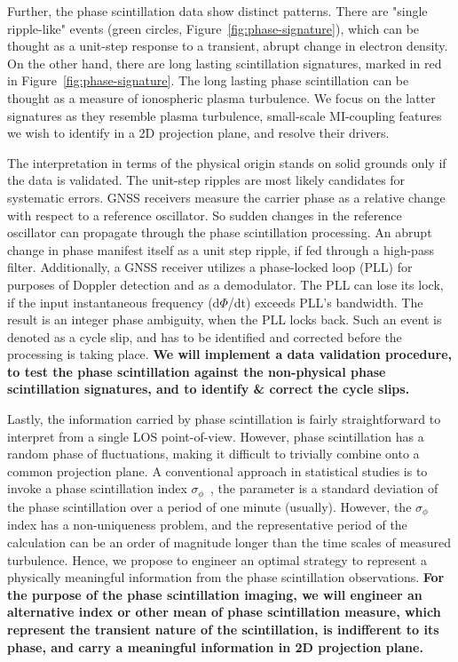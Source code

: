 \documentclass[letterpaper,12pt]{article}
\begin{document}
Further, the phase scintillation data show distinct patterns. There are "single ripple-like" events (green circles, Figure~\ref{fig:phase-signature}), which can be thought as a unit-step response to a transient, abrupt change in electron density. On the other hand, there are long lasting scintillation signatures, marked in red in Figure~\ref{fig:phase-signature}. The long lasting phase scintillation can be thought as a measure of ionospheric plasma turbulence. We focus on the latter signatures as they resemble plasma turbulence, small-scale MI-coupling features we wish to identify in a 2D projection plane, and resolve their drivers.

The interpretation in terms of the physical origin stands on solid grounds only if the data is validated. The unit-step ripples are most likely candidates for systematic errors. GNSS receivers measure the carrier phase as a relative change with respect to a reference oscillator. So sudden changes in the reference oscillator can propagate through the phase scintillation processing. An abrupt change in phase manifest itself as a unit step ripple, if fed through a high-pass filter. Additionally, a GNSS receiver utilizes a phase-locked loop (PLL) for purposes of Doppler detection and as a demodulator. The PLL can lose its lock, if the input instantaneous frequency (d$\Phi$/dt) exceeds PLL's bandwidth. The result is an integer phase ambiguity, when the PLL locks back. Such an event is denoted as a cycle slip, and has to be identified and corrected before the processing is taking place. \textbf{We will implement a data validation procedure, to test the phase scintillation against the non-physical phase scintillation signatures, and to identify \& correct the cycle slips.} 

Lastly, the information carried by phase scintillation is fairly straightforward to interpret from a single LOS point-of-view. However, phase scintillation has a random phase of fluctuations, making it difficult to trivially combine onto a common projection plane. A conventional approach in statistical studies is to invoke a phase scintillation index $\sigma_\phi$~\citep{Fremouw1978}, the parameter is a standard deviation of the phase scintillation over a period of one minute (usually). However, the $\sigma_\phi$ index has a non-uniqueness problem, and the representative period of the calculation can be an order of magnitude longer than the time scales of measured turbulence. Hence, we propose to engineer an optimal strategy to represent a physically meaningful information from the phase scintillation observations. \textbf{For the purpose of the phase scintillation imaging, we will engineer an alternative index or other mean of phase scintillation measure, which represent the transient nature of the scintillation, is indifferent to its phase, and carry a meaningful information in 2D projection plane.}
\end{document}
